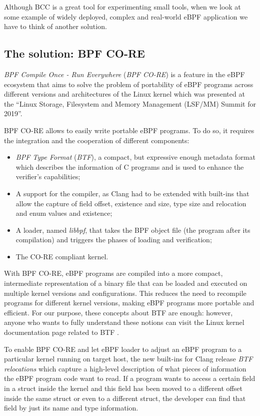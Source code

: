 Although BCC is a great tool for experimenting small tools, when we look at some example of widely deployed, complex and real-world eBPF application we have to think of another solution.

\subsection{The solution: BPF CO-RE}

\textit{BPF Compile Once - Run Everywhere} (\textit{BPF CO-RE}) is a feature in the eBPF ecosystem that aims to solve the problem of portability of eBPF programs across different versions and architectures of the Linux kernel which was presented at the ``Linux Storage, Filesystem and Memory Management (LSF/MM) Summit for 2019''.

BPF CO-RE allows to easily write portable eBPF programs.
To do so, it requires the integration and the cooperation of different components:

\begin{itemize}
	\item 
		\textit{BPF Type Format} (\textit{BTF}), a compact, but expressive enough metadata format which describes the information of C programs and is used to enhance the verifier's capabilities;
	\item 
		A support for the compiler, as Clang  had to be extended with built-ins that allow the capture of field offset, existence and size, type size and relocation and enum values and existence;
	\item 
		A loader, named \textit{libbpf}, that takes the BPF object file (the program after its compilation) and triggers the phases of loading and verification;
	\item 
		The CO-RE compliant kernel.
\end{itemize}

With BPF CO-RE, eBPF programs are compiled into a more compact, intermediate representation of a binary file that can be loaded and executed on multiple kernel versions and configurations.
This reduces the need to recompile programs for different kernel versions, making eBPF programs more portable and efficient. 
For our purpose, these concepts about BTF are enough: however, anyone who wants to fully understand these notions can visit the Linux kernel documentation page related to BTF \cite{BTFKernelDoc}.

To enable BPF CO-RE and let eBPF loader to adjust an eBPF program to a particular kernel running on target host, the new built-ins for Clang release \textit{BTF relocations} which capture a high-level description of what pieces of information the eBPF program code want to read.
If a program wants to access a certain field in a struct inside the kernel and this field has been moved to a different offset inside the same struct or even to a different struct, the developer can find that field by just its name and type information.

